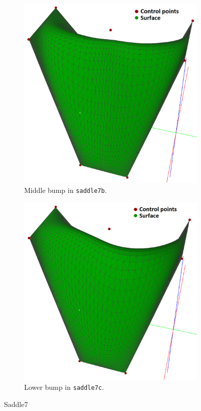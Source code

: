 \documentclass{article}
\begin{document}
\begin{figure}[H]
\begin{subfigure}[b]{0.32\textwidth}
\includegraphics[width=\textwidth]{saddle7b}
\caption{Middle bump in \texttt{saddle7b}.}
\label{saddle7b}
\end{subfigure}
\begin{subfigure}[b]{0.32\textwidth}
\includegraphics[width=\textwidth]{saddle7c}
\caption{Lower bump in \texttt{saddle7c}.}
\label{saddle7c}
\end{subfigure}
\caption{Saddle7}
\label{saddle7}
\end{figure}
\end{document}
